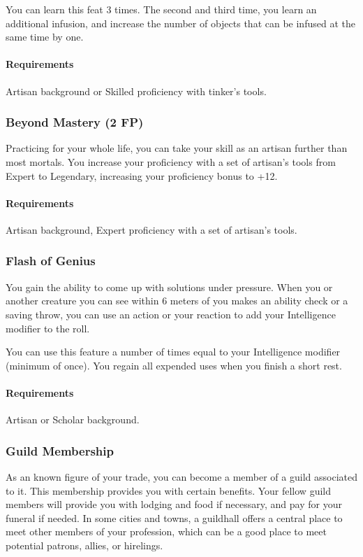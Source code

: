             You can learn this feat 3 times.
            The second and third time, you learn an additional infusion, and increase the number of objects that can be infused at the same time by one.

            \paragraph{Requirements} Artisan background or Skilled proficiency with tinker's tools.
        \subsubsection{Beyond Mastery (2 FP)} \label{feat::beyondmastery}
            Practicing for your whole life, you can take your skill as an artisan further than most mortals.
            You increase your proficiency with a set of artisan's tools from Expert to Legendary, increasing your proficiency bonus to +12.
            \paragraph{Requirements} Artisan background, Expert proficiency with a set of artisan's tools.
        \subsubsection{Flash of Genius} \label{feat::flashofgenius}
            You gain the ability to come up with solutions under pressure.
            When you or another creature you can see within 6 meters of you makes an ability check or a saving throw, you can use an action or your reaction to add your Intelligence modifier to the roll.

            You can use this feature a number of times equal to your Intelligence modifier (minimum of once).
            You regain all expended uses when you finish a short rest.
            \paragraph{Requirements} Artisan or Scholar background.
        \subsubsection{Guild Membership} \label{feat::guildmembership}
            As an known figure of your trade, you can become a member of a guild associated to it.
            This membership provides you with certain benefits.
            Your fellow guild members will provide you with lodging and food if necessary, and pay for your funeral if needed.
            In some cities and towns, a guildhall offers a central place to meet other members of your profession, which can be a good place to meet potential patrons, allies, or hirelings.

